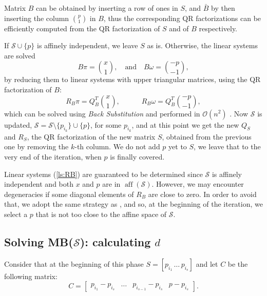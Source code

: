 Matrix $B$ can be obtained by inserting a row of ones in $S$, and $\bar{B}$ by then inserting the column $\binom{{p}}{1}$ in $B$, thus the corresponding QR factorizations can be efficiently computed from the QR factorization of $S$ and of $B$ respectively.

\smallskip

If ${\mathcal{S}}\cup \{{{p}}\}$ is affinely independent, we leave $S$ as is. Otherwise, the linear systems are solved
\begin{equation}\label{ls:B}
B\pi = \binom{x}{1},\quad\text{and}\quad B\omega = \binom{-{{p}}}{-1},
\end{equation}
\noindent by reducing them to linear systems with upper triangular matrices, using the QR factorization of $B$:
\begin{equation}\label{ls:RB}
R_B\pi = Q_B^T\binom{x}{1},\quad\quad\quad R_B\omega = Q_B^T\binom{-{{p}}}{-1},
\end{equation}
\noindent which can be solved using \emph{Back Substitution} and performed in ${\mathcal{O}}(n^2)$ \cite[\S 3.1]{Golub96}. Now ${\mathcal{S}}$ is updated, ${\mathcal{S}}={\mathcal{S}} \setminus \{p_{i_k}\}\cup\{{{p}}\}$, for some $p_{i_k}$, and at this point we get the new $Q_S$ and $R_S$, the QR factorization of the new matrix $S$, obtained from the previous one by removing the $k$-th column. We do not add ${{p}}$ yet to $S$, we leave that to the very end of the iteration, when ${{p}}$ is finally covered.

\smallskip

Linear systems (\ref{ls:RB}) are guaranteed to be determined since ${\mathcal{S}}$ is affinely independent and both $x$ and ${{p}}$ are in ${\operatorname{aff}}({\mathcal{S}})$. However, we may encounter degeneracies if some diagonal elements of $R_B$ are close to zero. In order to avoid that, we adopt the same strategy as \cite{Fischer03}, and so, at the beginning of the iteration, we select a ${{p}}$ that is not too close to the affine space of ${\mathcal{S}}$.

\subsection{Solving MB(${\mathcal{S}}$): calculating $d$}\label{subsec:app2}

Consider that at the beginning of this phase $S= \left[p_{i_1}\, \dots \, p_{i_{s}}\right]$ and let $C$ be the following matrix:		
\begin{equation}	\label{mat:C}C = \left[\begin{array}{cccc}
p_{i_1}-p_{i_s}& \dots & p_{i_{s-1}}-p_{i_s} & {{p}} - p_{i_s}
\end{array}\right].
\end{equation}

